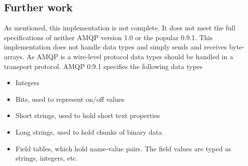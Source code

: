 \subsection{Further work}
As mentioned, this implementation is not complete. It does not meet the full specifications of neither AMQP version 1.0 or the popular 0.9.1. This implementation does not handle data types and simply sends and receives byte-arrays. As AMQP is a wire-level protocol data types should be handled in a transport protocol. AMQP 0.9.1 specifies the following data types\cite{Amqp09Types}
\begin{itemize}
\item Integers
\item Bits, used to represent on/off values
\item Short strings, used to hold short text properties
\item Long strings, used to hold chunks of binary data
\item Field tables, which hold name-value pairs. The field values are typed as strings, integers, etc.
\end{itemize}
\newpage